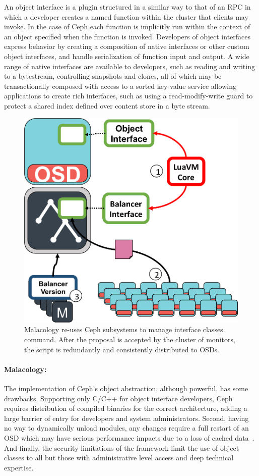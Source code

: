 \documentclass[10pt,twocolumn]{article}
\begin{document}
An object interface is a plugin structured in a similar way to that of an RPC
in which a developer creates a named function within the cluster that clients
may invoke. In the case of Ceph each function is implicitly run within the
context of an object specified when the function is invoked. Developers of
object interfaces express behavior by creating a composition of native
interfaces or other custom object interfaces, and handle serialization of
function input and output. A wide range of native interfaces are available to
developers, such as reading and writing to a bytestream, controlling snapshots
and clones, all of which may be transactionally composed with access to a
sorted key-value service allowing applications to create rich interfaces, such
as using a read-modify-write guard to protect a shared index defined over
content store in a byte stream.

\begin{figure}[htbp]
\centering
\includegraphics{figures/implementation.png}
\caption{Malacology re-uses Ceph subsystems to manage interface classes.
command. After the proposal is accepted by the cluster of monitors, the
script is redundantly and consistently distributed to OSDs.
\label{fig:implementation}}
\end{figure}

\paragraph*{Malacology:} The implementation of Ceph's object abstraction,
although powerful, has some drawbacks. Supporting only C/C++ for object
interface developers, Ceph requires distribution of compiled binaries for the
correct architecture, adding a large barrier of entry for developers and
system administrators. Second, having no way to dynamically unload modules,
any changes require a full restart of an OSD which may have serious
performance impacts due to a loss of cached data~\cite{facebook-mysql}. And
finally, the security limitations of the framework limit the use of object
classes to all but those with administrative level access and deep technical
expertise.
\end{document}
